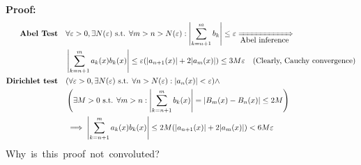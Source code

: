 \documentclass{article}
\newcommand{\st}{\mbox{ s.t. }}
\newcommand{\0}{{\bf{0}}}
\begin{document}
\textbf{Proof:}
\begin{equation}
\begin{split}
    \mbox{\textbf{Abel Test}}\quad&\forall \varepsilon>0,\exists N(\varepsilon)\st\forall m>n>N(\varepsilon):\left|\sum_{k=n+1}^mb_k\right|\le\varepsilon\xRightarrow[\mbox{Abel inference}]{}\\
    &\left|\sum_{k=n+1}^ma_k(x)b_k(x)\right|\le\varepsilon(|a_{n+1}(x)|+2|a_m(x)|)\le 3M\varepsilon\quad\mbox{(Clearly, Cauchy convergence)}\\
    \mbox{\textbf{Dirichlet test}}\quad&(\forall \varepsilon>0,\exists N(\varepsilon)\st\forall n>N(\varepsilon):|a_n(x)|<\varepsilon)\land\\
    &\left(\exists M>0\st\forall m>n:\left|\sum_{k=n+1}^mb_k(x)\right|=\left|B_m(x)-B_n(x)\right|\le2M\right)\\
    &\implies\left|\sum_{k=n+1}^ma_k(x)b_k(x)\right|\le2M(|a_{n+1}(x)|+2|a_m(x)|)<6M\varepsilon
\end{split}
\end{equation}
\null\hfill{\mbox{Why is this proof not convoluted?}}
\end{document}
